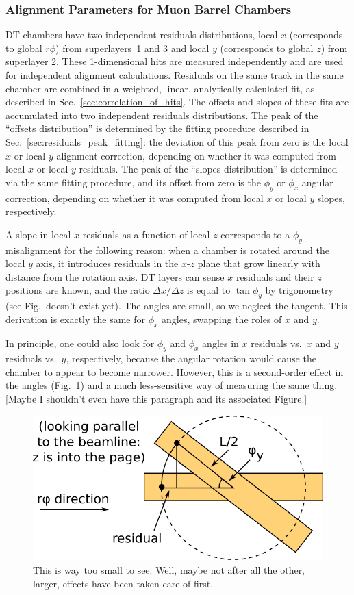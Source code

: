 \documentclass[12pt]{article}
\begin{document}
\subsubsection{Alignment Parameters for Muon Barrel Chambers}

DT chambers have two independent residuals distributions, local $x$
(corresponds to global $r\phi$) from superlayers~1 and 3 and local $y$
(corresponds to global $z$) from superlayer 2.  These 1-dimensional
hits are measured independently and are used for independent alignment
calculations.  Residuals on the same track in the same chamber are
combined in a weighted, linear, analytically-calculated fit, as
described in Sec.~\ref{sec:correlation_of_hits}.  The offsets and
slopes of these fits are accumulated into two independent residuals
distributions.  The peak of the ``offsets distribution'' is determined
by the fitting procedure described in
Sec.~\ref{sec:residuals_peak_fitting}: the deviation of this peak from
zero is the local $x$ or local $y$ alignment correction, depending on
whether it was computed from local $x$ or local $y$ residuals.  The
peak of the ``slopes distribution'' is determined via the same fitting
procedure, and its offset from zero is the $\phi_y$ or $\phi_x$
angular correction, depending on whether it was computed from local
$x$ or local $y$ slopes, respectively.

A slope in local $x$ residuals as a function of local $z$ corresponds
to a $\phi_y$ misalignment for the following reason: when a chamber is
rotated around the local $y$ axis, it introduces residuals in the
$x$-$z$ plane that grow linearly with distance from the rotation axis.
DT layers can sense $x$ residuals and their $z$ positions are known,
and the ratio $\Delta x/\Delta z$ is equal to $\tan \phi_y$ by
trigonometry (see Fig.~doesn't-exist-yet).  The angles are small, so
we neglect the tangent.  This derivation is exactly the same for
$\phi_x$ angles, swapping the roles of $x$ and $y$.

In principle, one could also look for $\phi_y$ and $\phi_x$ angles in
$x$ residuals vs.\ $x$ and $y$ residuals vs.\ $y$, respectively,
because the angular rotation would cause the chamber to appear to
become narrower.  However, this is a second-order effect in the angles
(Fig.~\ref{fig:phiy_explanation}) and a much less-sensitive way of
measuring the same thing.  [Maybe I shouldn't even have this paragraph
  and its associated Figure.]

\begin{figure}
\begin{center} \includegraphics[width=0.35\linewidth]{phiy_explanation.png} \end{center}
\caption{This is way too small to see.  Well, maybe not after all the other, larger, effects have been taken care of first. \label{fig:phiy_explanation}}
\end{figure}
\end{document}
